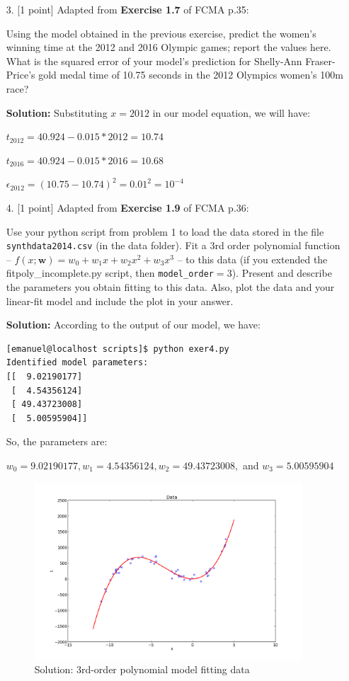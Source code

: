 \documentclass[10pt]{article}
\begin{document}
\begin{itemize}
\item[3.] [1 point]
Adapted from {\bf Exercise 1.7} of FCMA p.35:

Using the model obtained in the previous exercise, predict the women's winning time at the 2012 and 2016 Olympic games; report the values here.  What is the squared error of your model's prediction for Shelly-Ann Fraser-Price's gold medal time of 10.75 seconds in the 2012 Olympics women's 100m race?

{\bf Solution:} Substituting $x = 2012$ in our model equation, we will have:

$t_{2012} =  40.924 -0.015*2012 = 10.74$

$t_{2016} =  40.924 -0.015*2016 = 10.68$

$\epsilon_{2012} = (10.75 - 10.74)^{2} = 0.01^{2} = 10^{-4}$


\item[4.] [1 point]
Adapted from {\bf Exercise 1.9} of FCMA p.36:

Use your python script from problem 1 to load the data stored in the file {\tt synthdata2014.csv} (in the data folder).  Fit a 3rd order polynomial function -- $f(x; \mathbf{w}) = w_0 + w_1 x + w_2 x^2 + w_3 x^3$ -- to this data (if you extended the {fitpoly\_incomplete.py} script, then {\tt model\_order}$ = 3$).  
Present and describe the parameters you obtain fitting to this data.  Also, plot the data and your linear-fit model and include the plot in your answer.

{\bf Solution:} According to the output of our model, we have:

\begin{verbatim}
[emanuel@localhost scripts]$ python exer4.py 
Identified model parameters:
[[  9.02190177]
 [  4.54356124]
 [ 49.43723008]
 [  5.00595904]]
\end{verbatim}

So, the parameters are:

$w_{0} = 9.02190177, w_{1} = 4.54356124, w_{2} = 49.43723008,$ and $w_{3} = 5.00595904 $

\begin{figure}[htb]
\begin{center}
\includegraphics[width=10cm]{figs/figure_4.png}
\caption{Solution: 3rd-order polynomial model fitting data}
\end{center}
\end{figure}





\end{itemize}
\end{document}
